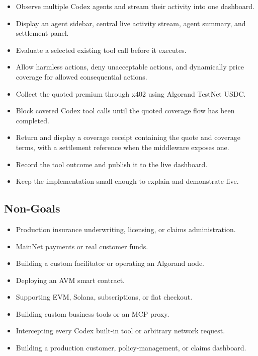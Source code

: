 \documentclass[11pt]{article}
\begin{document}
\begin{itemize}[leftmargin=*]
  \item Observe multiple Codex agents and stream their activity into one
  dashboard.
  \item Display an agent sidebar, central live activity stream, agent summary,
  and settlement panel.
  \item Evaluate a selected existing tool call before it executes.
  \item Allow harmless actions, deny unacceptable actions, and dynamically
  price coverage for allowed consequential actions.
  \item Collect the quoted premium through x402 using Algorand TestNet USDC.
  \item Block covered Codex tool calls until the quoted coverage flow has been
  completed.
  \item Return and display a coverage receipt containing the quote and coverage
  terms, with a settlement reference when the middleware exposes one.
  \item Record the tool outcome and publish it to the live dashboard.
  \item Keep the implementation small enough to explain and demonstrate live.
\end{itemize}

\subsection{Non-Goals}

\begin{itemize}[leftmargin=*]
  \item Production insurance underwriting, licensing, or claims administration.
  \item MainNet payments or real customer funds.
  \item Building a custom facilitator or operating an Algorand node.
  \item Deploying an AVM smart contract.
  \item Supporting EVM, Solana, subscriptions, or fiat checkout.
  \item Building custom business tools or an MCP proxy.
  \item Intercepting every Codex built-in tool or arbitrary network request.
  \item Building a production customer, policy-management, or claims dashboard.
\end{itemize}
\end{document}
